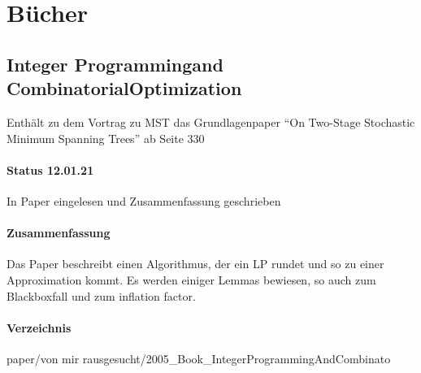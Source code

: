 \documentclass[paper=a4,10pt]{scrartcl}
\begin{document}
\section{Bücher}
\subsection{Integer Programmingand CombinatorialOptimization}

Enthält zu dem Vortrag zu MST das Grundlagenpaper ``On Two-Stage Stochastic Minimum Spanning Trees'' ab Seite 330

\paragraph{Status 12.01.21} In Paper eingelesen und Zusammenfassung geschrieben
\paragraph{Zusammenfassung}	Das Paper beschreibt einen Algorithmus, der ein LP rundet und so zu einer Approximation kommt. Es werden einiger Lemmas bewiesen, so auch zum Blackboxfall und zum inflation factor.
\paragraph{Verzeichnis} paper/von mir rausgesucht/2005\_Book\_IntegerProgrammingAndCombinato
\end{document}
